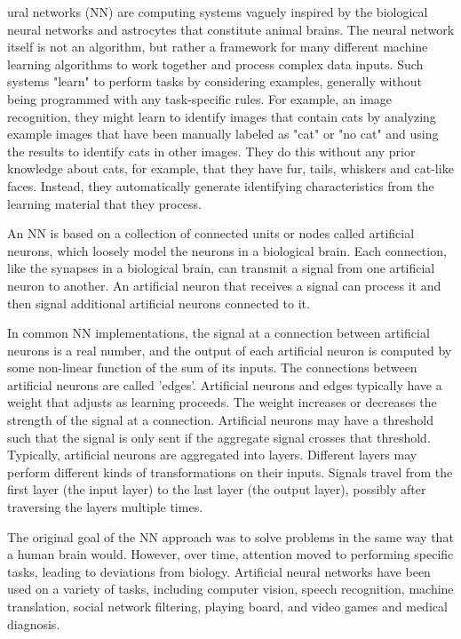 \documentclass[journal]{IEEEtran}
\begin{document}
ural networks (NN) are computing systems vaguely inspired by the biological neural networks and astrocytes that constitute animal brains. The neural network itself is not an algorithm, but rather a framework for many different machine learning algorithms to work together and process complex data inputs. Such systems "learn" to perform tasks by considering examples, generally without being programmed with any task-specific rules. For example, an image recognition, they might learn to identify images that contain cats by analyzing example images that have been manually labeled as "cat" or "no cat" and using the results to identify cats in other images. They do this without any prior knowledge about cats, for example, that they have fur, tails, whiskers and cat-like faces. Instead, they automatically generate identifying characteristics from the learning material that they process.

An NN is based on a collection of connected units or nodes called artificial neurons, which loosely model the neurons in a biological brain. Each connection, like the synapses in a biological brain, can transmit a signal from one artificial neuron to another. An artificial neuron that receives a signal can process it and then signal additional artificial neurons connected to it.

In common NN implementations, the signal at a connection between artificial neurons is a real number, and the output of each artificial neuron is computed by some non-linear function of the sum of its inputs. The connections between artificial neurons are called 'edges'. Artificial neurons and edges typically have a weight that adjusts as learning proceeds. The weight increases or decreases the strength of the signal at a connection. Artificial neurons may have a threshold such that the signal is only sent if the aggregate signal crosses that threshold. Typically, artificial neurons are aggregated into layers. Different layers may perform different kinds of transformations on their inputs. Signals travel from the first layer (the input layer) to the last layer (the output layer), possibly after traversing the layers multiple times.

The original goal of the NN approach was to solve problems in the same way that a human brain would. However, over time, attention moved to performing specific tasks, leading to deviations from biology. Artificial neural networks have been used on a variety of tasks, including computer vision, speech recognition, machine translation, social network filtering, playing board, and video games and medical diagnosis.
\end{document}
